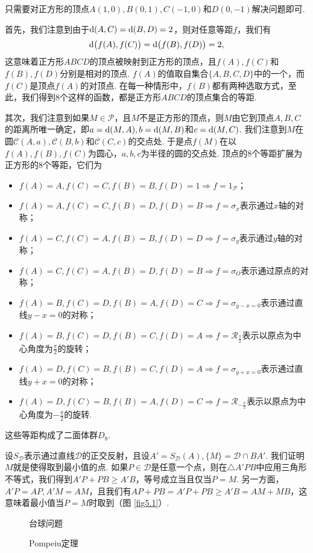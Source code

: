 \begin{solution}
  只需要对正方形的顶点$A(1,0),B(0,1),C(-1,0)$和$D(0,-1)$解决问题即可.

  首先，我们注意到由于$\mathop{}\!\mathrm d(A,C)=\mathop{}\!\mathrm d(B,D)=2$，则对任意等距$f$，我们有
  \[
    \mathop{}\!\mathrm d\big( f(A),f(C) \big) = \mathop{}\!\mathrm d\big(f(B),f(D)\big) = 2,
  \]
  这意味着正方形$ABCD$的顶点被映射到正方形的顶点，且$f(A),f(C)$和$f(B),f(D)$分别是相对的顶点. $f(A)$的值取自集合$\{A,B,C,D\}$中的一个，而$f(C)$是顶点$f(A)$的对顶点. 在每一种情形中，$f(B)$都有两种选取方式，至此，我们得到8个这样的函数，都是正方形$ABCD$的顶点集合的等距.

  其次，我们注意到如果$M\in\mathscr P$，且$M$不是正方形的顶点，则$M$由它到顶点$A,B,C$的距离所唯一确定，即$a=\mathop{}\!\mathrm d(M,A),b=\mathop{}\!\mathrm d(M,B)$和$c=\mathop{}\!\mathrm d(M,C)$. 我们注意到$M$在圆$\mathscr C(A,a),\mathscr C(B,b)$和$\mathscr  C(C,c)$的交点处. 于是点$f(M)$在以$f(A),f(B),f(C)$为圆心，$a,b,c$为半径的圆的交点处. 顶点的8个等距扩展为正方形的8个等距，它们为
  \begin{itemize}
    \item $f(A)=A,f(C)=C,f(B)=B,f(D)=1\Rightarrow f=1_{\mathscr P}$；
    \item $f(A)=A,f(C)=C,f(B)=D,f(D)=B\Rightarrow f=\sigma_x$表示通过$x$轴的对称；
    \item $f(A)=C,f(C)=A,f(B)=B,f(D)=D\Rightarrow f=\sigma_y$表示通过$y$轴的对称；
    \item $f(A)=C,f(C)=A,f(B)=D,f(D)=B\Rightarrow f=\sigma_O$表示通过原点的对称；
    \item $f(A)=B,f(C)=D,f(B)=A,f(D)=C\Rightarrow f=\sigma_{y-x=0}$表示通过直线$y-x=0$的对称；
    \item $f(A)=B,f(C)=D,f(B)=C,f(D)=A\Rightarrow f=\mathscr R_{\frac\pi2}$表示以原点为中心角度为$\frac\pi2$的旋转；
    \item $f(A)=D,f(C)=B,f(B)=C,f(D)=A\Rightarrow f=\sigma_{y+x=0}$表示通过直线$y+x=0$的对称；
    \item $f(A)=D,f(C)=B,f(B)=A,f(D)=C\Rightarrow f=\mathscr R_{-\frac\pi2}$表示以原点为中心角度为$-\frac\pi2$的旋转.
  \end{itemize}
  这些等距构成了二面体群$D_8$.
\end{solution}

\begin{solution}
  设$S_{\mathscr D}$表示通过直线$\mathscr D$的正交反射，且设$A'=S_{\mathscr D}(A),\{M\}=\mathscr D\cap BA'$. 我们证明$M$就是使得取到最小值的点. 如果$P\in\mathscr D$是任意一个点，则在$\triangle A'PB$中应用三角形不等式，我们得到$A'P+PB\ge A'B$，等号成立当且仅当$P=M$. 另一方面，$A'P=AP,A'M=AM$，且我们有$AP+PB=A'P+PB\ge A'B=AM+MB$，这意味着最小值当$P=M$时取到（图 \ref{fig5.1}）.
\end{solution}
\begin{figure}[!ht]
  \centering
  \begin{minipage}[b]{0.5\linewidth}
    \centering
    
    \caption{台球问题}\label{fig5.1}
  \end{minipage}%
  \begin{minipage}[b]{0.5\linewidth}
    \centering
    
    \caption{Pompeiu定理}\label{fig5.2}
  \end{minipage}
\end{figure}

